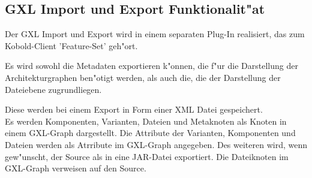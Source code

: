 \subsection{GXL Import und Export Funktionalit"at}
Der GXL Import und Export wird in einem
separaten Plug-In realisiert, das zum Kobold-Client 'Feature-Set'
geh"ort.\par Es wird sowohl die Metadaten exportieren k"onnen, die f"ur
die Darstellung der Architekturgraphen ben"otigt werden, als auch
die, die der Darstellung der Dateiebene zugrundliegen.
\par
Diese werden bei einem Export in Form einer XML Datei gespeichert.\\
Es werden Komponenten, Varianten, Dateien und Metaknoten als Knoten in einem GXL-Graph dargestellt.
Die Attribute der Varianten, Komponenten und Dateien werden als Atrribute im GXL-Graph angegeben.
Des weiteren wird, wenn gew"unscht, der Source als in eine JAR-Datei exportiert. Die Dateiknoten im GXL-Graph verweisen auf den Source.
